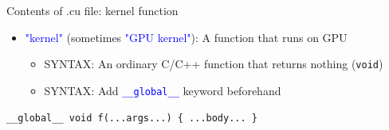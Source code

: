 \documentclass[dvipdfmx, 11pt, aspectratio=169]{beamer}   %
\begin{document}
\begin{frame}[fragile]{Contents of .cu file: kernel function}
  \begin{itemize}
    \item \textcolor{blue}{"kernel"} (sometimes \textcolor{blue}{"GPU kernel"}): A function that runs on GPU
    \begin{itemize}
      \item SYNTAX: An ordinary C/C++ function that returns nothing (\lstinline|void|)
      \item SYNTAX: Add \textcolor{blue}{\lstinline|__global__|} keyword beforehand
    \end{itemize}
  \end{itemize}
  \begin{block}{}
    \begin{lstlisting}[caption=kernel template, language=CUDA]
__global__ void f(...args...) { ...body... }
    \end{lstlisting}
  \end{block}
\end{frame}
\end{document}
